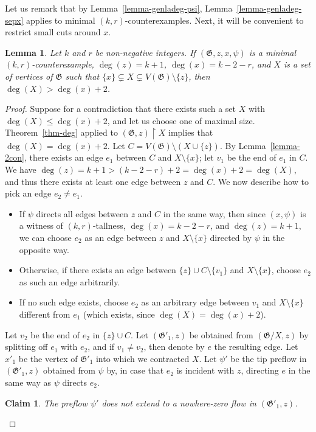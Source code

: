 \documentclass{article}
\newcommand\g{\mathfrak{G}}
\newtheorem{lemma}[theorem]{Lemma}
\newtheorem*{claim*}{Claim}
\begin{document}
Let us remark that by Lemma~\ref{lemma-genladeg-psi}, Lemma~\ref{lemma-genladeg-sepx} applies to minimal $(k,r)$-counterexamples.
Next, it will be convenient to restrict small cuts around $x$.
\begin{lemma}\label{lemma-aroundx}
Let $k$ and $r$ be non-negative integers.  If $(\g,z,x,\psi)$ is a minimal $(k,r)$-counter\-exam\-ple, $\deg(z)=k+1$, $\deg(x)=k-2-r$,
and $X$ is a set of vertices of $\g$ such that $\{x\}\subsetneq X\subsetneq V(\g)\setminus \{z\}$,
then $\deg(X) > \deg(x)+2$.
\end{lemma}
\begin{proof}
Suppose for a contradiction that there exists such a set $X$ with $\deg(X)\le \deg(x)+2$, and let us choose one of maximal size.
Theorem~\ref{thm-deg} applied to $(\g,z)\restriction X$ implies that $\deg(X)=\deg(x)+2$.  Let $C=V(\g)\setminus (X\cup\{z\})$.
By Lemma~\ref{lemma-2con}, there exists an edge $e_1$ between $C$ and $X\setminus\{x\}$; let $v_1$ be the end of $e_1$ in $C$.
We have $\deg(z)=k+1>(k-2-r)+2=\deg(x)+2=\deg(X)$, and thus there exists at least one
edge between $z$ and $C$. We now describe how to pick an edge $e_{2} \neq e_{1}$.
\begin{itemize}
\item If $\psi$ directs all edges between $z$ and $C$ in the same way, then since $(x,\psi)$ is a witness of $(k,r)$-tallness, $\deg(x)=k-2-r$, and $\deg(z)=k+1$,
we can choose $e_2$ as an edge between $z$ and $X\setminus\{x\}$ directed by $\psi$ in the opposite way.
\item  Otherwise, if there exists an edge between $\{z\}\cup C\setminus \{v_1\}$ and $X\setminus\{x\}$, choose $e_2$ as such an edge arbitrarily.
\item If no such edge exists, choose $e_2$ as an arbitrary edge between $v_1$ and $X\setminus\{x\}$ different from $e_1$ 
(which exists, since $\deg(X)=\deg(x)+2$). 
\end{itemize}
Let $v_2$ be the end of $e_2$ in $\{z\}\cup C$.
Let $(\g'_1,z)$ be obtained from $(\g/X,z)$ by splitting off $e_1$ with $e_2$, and if $v_1\neq v_2$, then denote by $e$ the resulting edge.
Let $x'_1$ be the vertex of $\g'_1$ into which we contracted $X$.
Let $\psi'$ be the tip preflow in $(\g'_1,z)$ obtained from $\psi$ by, in case that $e_2$ is incident with $z$, directing $e$ in the same way as $\psi$ directs $e_2$.

\begin{claim*}
The preflow $\psi'$ does not extend to a nowhere-zero flow in $(\g'_1,z)$.
\end{claim*}


\end{proof}
\end{document}
